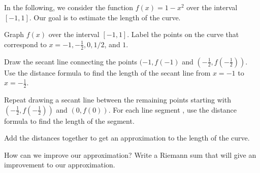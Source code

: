 \begin{pa} \label{PA:6.3}  In the following, we consider the function $f(x)=1-x^2$ over the interval $[-1,1]$. Our goal is to estimate the length of the curve. 

\ba
\item Graph $f(x)$ over the interval $[-1,1]$. Label the points on the curve that correspond to $x=-1,-\frac12,0,1/2$, and $1$.  

\item Draw the secant line connecting the points $(-1,f(-1)$ and \newline $(-\frac{1}{2},f(-\frac{1}{2}))$. Use the distance formula to find the length of the secant line from $x=-1$ to $x=-\frac12$.
\item Repeat drawing a secant line between the remaining points starting with $(-\frac{1}{2},f(-\frac{1}{2}))$ and $(0,f(0))$. For each line segment , use the distance formula to find the length of the segment.
\item Add the distances together to get an approximation to the length of the curve. 
\item How can we improve our approximation? Write a Riemann sum that will give an improvement to our approximation. 
\ea
\end{pa} 
\afterpa